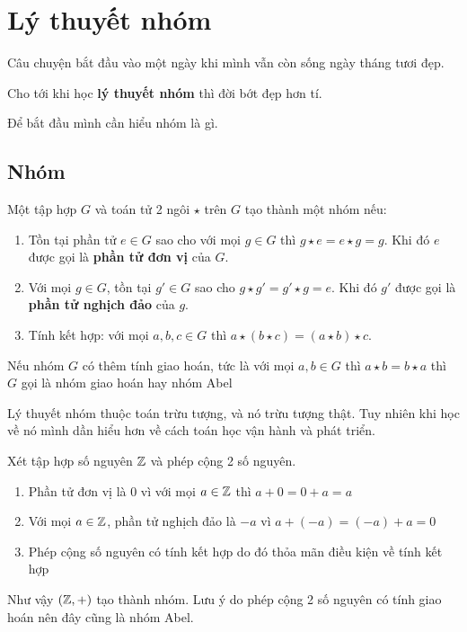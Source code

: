\chapter{Lý thuyết nhóm}

Câu chuyện bắt đầu vào một ngày khi mình vẫn còn sống ngày tháng tươi đẹp.

Cho tới khi học \textbf{lý thuyết nhóm} thì đời bớt đẹp hơn tí.

Để bắt đầu mình cần hiểu nhóm là gì.

\section{Nhóm}

\begin{definition}
    Một tập hợp $G$ và toán tử 2 ngôi $\star$ trên $G$ tạo thành một nhóm nếu:
    \begin{enumerate}[noitemsep]
        \item Tồn tại phần tử $e \in G$ sao cho với mọi $g \in G$ thì $g \star e = e \star g = g$. Khi đó $e$ được gọi là \textbf{phần tử đơn vị} của $G$.
        \item Với mọi $g \in G$, tồn tại $g' \in G$ sao cho $g \star g' = g' \star g = e$. Khi đó $g'$ được gọi là \textbf{phần tử nghịch đảo} của $g$.
        \item Tính kết hợp: với mọi $a, b, c \in G$ thì $a \star (b \star c) = (a \star b) \star c$.
    \end{enumerate}
\end{definition}


\begin{definition}
    Nếu nhóm $G$ có thêm tính giao hoán, tức là với mọi $a, b \in G$ thì $a \star b = b \star a$ thì $G$ gọi là nhóm giao hoán hay nhóm Abel
\end{definition}

Lý thuyết nhóm thuộc toán trừu tượng, và nó trừu tượng thật. Tuy nhiên khi học về nó mình dần hiểu hơn về cách toán học vận hành và phát triển.

\begin{example}
    Xét tập hợp số nguyên $\mathbb{Z}$ và phép cộng 2 số nguyên.
    \begin{enumerate}[noitemsep]
        \item Phần tử đơn vị là 0 vì với mọi $a \in \mathbb{Z}$ thì $a + 0 = 0 + a = a$
        \item Với mọi $a \in \mathbb{Z}$, phần tử nghịch đảo là $-a$ vì $a + (-a) = (-a) + a = 0$
        \item Phép cộng số nguyên có tính kết hợp do đó thỏa mãn điều kiện về tính kết hợp
    \end{enumerate}
    Như vậy $(\mathbb{Z}, +)$ tạo thành nhóm. Lưu ý do phép cộng 2 số nguyên có tính giao hoán nên đây cũng là nhóm Abel.
\end{example}

